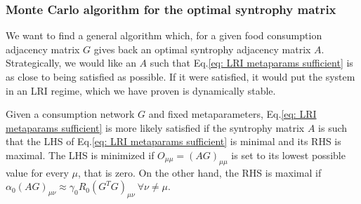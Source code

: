 \documentclass[12pt, titlepage]{report}
\begin{document}
\subsubsection{Monte Carlo algorithm for the optimal syntrophy matrix} \label{section: methods LRI MC solver}
We want to find a general algorithm which, for a given food consumption adjacency matrix $G$ gives back an optimal syntrophy adjacency matrix $A$. Strategically, we would like an $A$ such that Eq.\eqref{eq: LRI metaparams sufficient} is as close to being satisfied as possible. If it were satisfied, it would put the system in an LRI regime, which we have proven is dynamically stable.

Given a consumption network $G$ and fixed metaparameters, Eq.\eqref{eq: LRI metaparams sufficient} is more likely satisfied if the syntrophy matrix $A$ is such that the LHS of Eq.\eqref{eq: LRI metaparams sufficient} is minimal and its RHS is maximal. The LHS is minimized if $O_{\mu\mu}=(AG)_{\mu\mu}$ is set to its lowest possible value for every $\mu$, that is zero. On the other hand, the RHS is maximal if $\alpha_0(AG)_{\mu\nu}\approx\gamma_0R_0 (G^TG)_{\mu\nu} \ \forall \nu\neq\mu$.
\end{document}
